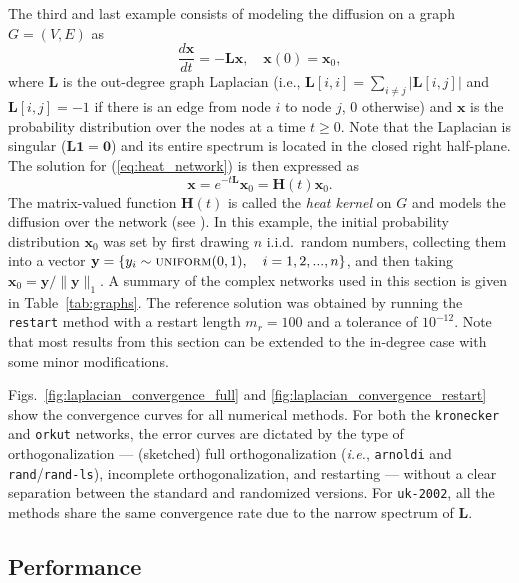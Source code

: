 \documentclass[smallextended]{svjour3}
\renewcommand{\vec}[1]{\mathbf{#1}}
\newcommand{\mat}[1]{\mathbf{#1}}
\newcommand{\ie}{{\em i.e.}}
\newcommand{\norm}[1]{\| #1 \|}
\begin{document}
The third and last example consists of modeling the diffusion on a graph $G = (V, E)$ as
\begin{equation}
\label{eq:heat_network}
\frac{d \vec{x}}{dt} = -\mat{L} \vec{x}, \quad \vec{x}(0) = \vec{x}_0,
\end{equation}
where $\mat{L}$ is the out-degree graph Laplacian (i.e., $\mat{L}[i, i] = \sum_{i \neq j} |\mat{L}[i, j]|$ and $\mat{L}[i, j] = -1$ if there is an edge from node $i$ to node $j$, $0$ otherwise) and $\vec{x}$ is the probability distribution over the nodes at a time $t \geq 0$. Note that the Laplacian is singular ($\mat{L} \vec{1} = \vec{0}$) and its entire spectrum is located in the closed right half-plane. The solution for (\ref{eq:heat_network}) is then expressed as
\begin{equation}
\label{background:eq:heat_laplacian_sol}
\vec{x} = e^{-t \mat{L}} \vec{x}_0 = \mat{H}(t) \vec{x}_0.
\end{equation}
The matrix-valued function $\mat{H}(t)$ is called the \textit{heat kernel} on $G$ and models the diffusion over the network (see \cite[Section 6.2]{benzi_matrix_2020}). In this example, the initial probability distribution $\vec{x}_0$ was set by first drawing $n$ i.i.d.\ random numbers, collecting them into a vector $\vec{y} = \{ y_i \sim \textsc{uniform}(0, 1), \quad i = 1, 2, ..., n \}$, and then taking $\vec{x}_0 = \vec{y} / \norm{\vec{y}}_1$. A summary of the complex networks used in this section is given in Table~\ref{tab:graphs}. The reference solution was obtained by running the \texttt{restart} method with a restart length $m_r = 100$ and a tolerance of $10^{-12}$. Note that most results from this section can be extended to the in-degree case with some minor modifications.

Figs.~\ref{fig:laplacian_convergence_full} and \ref{fig:laplacian_convergence_restart} show the convergence curves for all numerical methods. For both the \texttt{kronecker} and \texttt{orkut} networks, the error curves are dictated by the type of orthogonalization --- (sketched) full orthogonalization (\ie, \texttt{arnoldi} and \texttt{rand}/\texttt{rand-ls}), incomplete orthogonalization, and restarting --- without a clear separation between the standard and randomized versions. For \texttt{uk-2002}, all the methods share the same convergence rate due to the narrow spectrum of $\mat{L}$.

\subsection{Performance}
\label{sec:performance}
\end{document}
